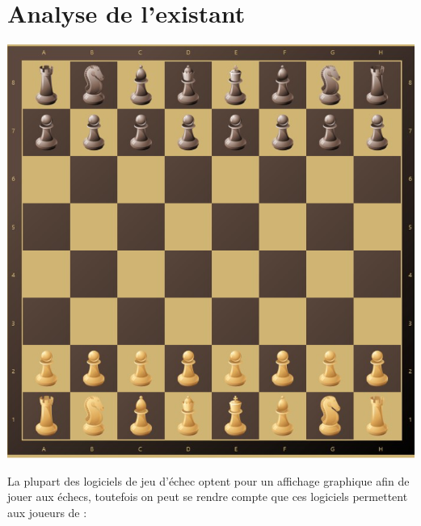 \documentclass{article}
\begin{document}
\section{Analyse de l'existant}
\centerline{\includegraphics[scale = 0.25]{Echiquier.png}}
La plupart des logiciels de jeu d'échec optent pour un affichage graphique afin de jouer aux échecs, toutefois on peut se rendre compte que ces logiciels permettent aux joueurs de :
\end{document}
